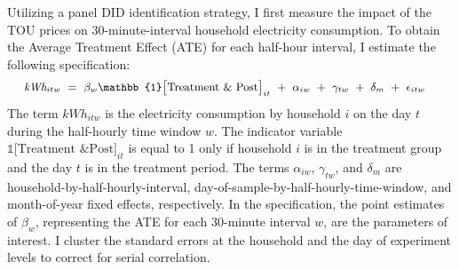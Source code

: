 Utilizing a panel DID identification strategy, I first measure the impact of the TOU prices on 30-minute-interval household electricity consumption. To obtain the Average Treatment Effect (ATE) for each half-hour interval, I estimate the following specification:
\begin{equation}
\small
\begin{split}
    \textit{kWh}_{itw} \ 
    & = \ \beta_{w} \mathbb{1}\big[ \text{Treatment \& Post} \big]_{it} \ + \ \alpha_{iw} \ + \ \gamma_{tw} \ + \ \delta_{m} \ + \ \epsilon_{itw}
\end{split}
\label{Eq:Model-Specification_Half-Hourly-Average-Treatment-Effects}
\end{equation}
The term $kWh_{itw}$ is the electricity consumption by household $i$ on the day $t$ during the half-hourly time window $w$. The indicator variable $\mathbb{1}\big[ \text{Treatment \& Post} \big]_{it}$ is equal to 1 only if household $i$ is in the treatment group and the day $t$ is in the treatment period. The terms $\alpha_{iw}$, $\gamma_{tw}$, and $\delta_{m}$ are household-by-half-hourly-interval, day-of-sample-by-half-hourly-time-window, and month-of-year fixed effects, respectively. In the specification, the point estimates of $\beta_{w}$, representing the ATE for each 30-minute interval $w$, are the parameters of interest. I cluster the standard errors at the household and the day of experiment levels to correct for serial correlation.


